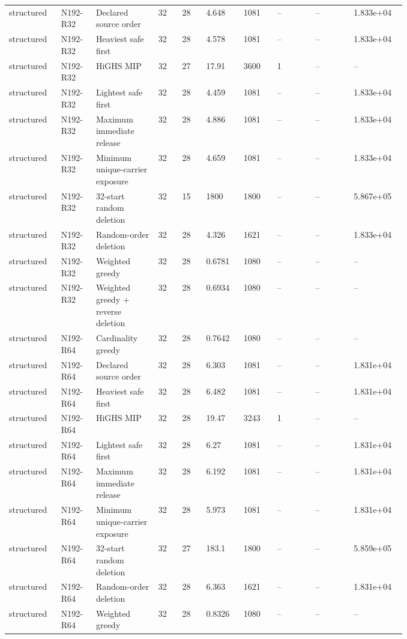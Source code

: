 {\begin{longtable}{p{0.07\linewidth}p{0.06\linewidth}p{0.13\linewidth}p{0.055\linewidth}p{0.055\linewidth}p{0.075\linewidth}p{0.075\linewidth}p{0.085\linewidth}p{0.085\linewidth}p{0.085\linewidth}}
structured & N192-R32 & Declared source order & 32 & 28 & 4.648 & 1081 & -- & -- & 1.833e+04 \\
structured & N192-R32 & Heaviest safe first & 32 & 28 & 4.578 & 1081 & -- & -- & 1.833e+04 \\
structured & N192-R32 & HiGHS MIP & 32 & 27 & 17.91 & 3600 & 1 & -- & -- \\
structured & N192-R32 & Lightest safe first & 32 & 28 & 4.459 & 1081 & -- & -- & 1.833e+04 \\
structured & N192-R32 & Maximum immediate release & 32 & 28 & 4.886 & 1081 & -- & -- & 1.833e+04 \\
structured & N192-R32 & Minimum unique-carrier exposure & 32 & 28 & 4.659 & 1081 & -- & -- & 1.833e+04 \\
structured & N192-R32 & 32-start random deletion & 32 & 15 & 1800 & 1800 & -- & -- & 5.867e+05 \\
structured & N192-R32 & Random-order deletion & 32 & 28 & 4.326 & 1621 & -- & -- & 1.833e+04 \\
structured & N192-R32 & Weighted greedy & 32 & 28 & 0.6781 & 1080 & -- & -- & -- \\
structured & N192-R32 & Weighted greedy + reverse deletion & 32 & 28 & 0.6934 & 1080 & -- & -- & -- \\
structured & N192-R64 & Cardinality greedy & 32 & 28 & 0.7642 & 1080 & -- & -- & -- \\
structured & N192-R64 & Declared source order & 32 & 28 & 6.303 & 1081 & -- & -- & 1.831e+04 \\
structured & N192-R64 & Heaviest safe first & 32 & 28 & 6.482 & 1081 & -- & -- & 1.831e+04 \\
structured & N192-R64 & HiGHS MIP & 32 & 28 & 19.47 & 3243 & 1 & -- & -- \\
structured & N192-R64 & Lightest safe first & 32 & 28 & 6.27 & 1081 & -- & -- & 1.831e+04 \\
structured & N192-R64 & Maximum immediate release & 32 & 28 & 6.192 & 1081 & -- & -- & 1.831e+04 \\
structured & N192-R64 & Minimum unique-carrier exposure & 32 & 28 & 5.973 & 1081 & -- & -- & 1.831e+04 \\
structured & N192-R64 & 32-start random deletion & 32 & 27 & 183.1 & 1800 & -- & -- & 5.859e+05 \\
structured & N192-R64 & Random-order deletion & 32 & 28 & 6.363 & 1621 & -- & -- & 1.831e+04 \\
structured & N192-R64 & Weighted greedy & 32 & 28 & 0.8326 & 1080 & -- & -- & -- \\

\end{longtable}}
